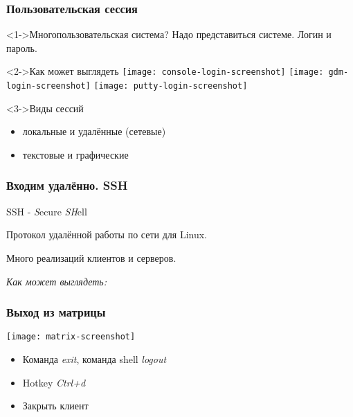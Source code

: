 \begin{frame}
  \frametitle{Пользовательская сессия}

  \begin{center}
    \begin{block}<1->{Многопользовательская система?}
      Надо представиться системе. Логин и пароль.
    \end{block}

    \begin{block}<2->{Как может выглядеть}
      \texttt{[image: console-login-screenshot]}
      \texttt{[image: gdm-login-screenshot]}
      \texttt{[image: putty-login-screenshot]}
    \end{block}

    \begin{block}<3->{Виды сессий}
      \begin{itemize}
        \item локальные и удалённые (сетевые)
        \item текстовые и графические
      \end{itemize}
    \end{block}

  \end{center}

\end{frame}

\begin{frame}
  \frametitle{Входим удалённо. SSH}

  \begin{center}

    SSH - \emph{S}ecure \emph{SH}ell
    \newline \pause

    Протокол удалённой работы по сети для Linux.

    Много реализаций клиентов и серверов.
    \newline
    \pause

    \emph{Как может выглядеть:}
    \newline
    \emph{ }
  \end{center}

\end{frame}

\begin{frame}
  \frametitle{Выход из матрицы}

  \begin{center}
    \texttt{[image: matrix-screenshot]}
    \pause
    \newline
    \begin{itemize}
      \item Команда \emph{exit}, команда shell \emph{logout}
      \item Hotkey \emph{Ctrl+d}
      \item Закрыть клиент
    \end{itemize}
  \end{center}

\end{frame}
